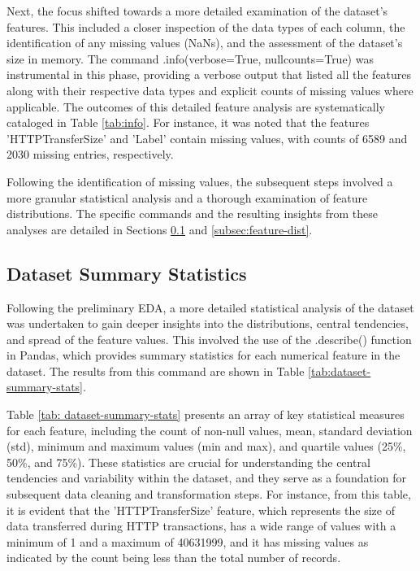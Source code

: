 Next, the focus shifted towards a more detailed examination of the dataset's features. This included a closer inspection of the data types of each column, the identification of any missing values (NaNs), and the assessment of the dataset's size in memory. The command .info(verbose=True, null\textunderscore counts=True) was instrumental in this phase, providing a verbose output that listed all the features along with their respective data types and explicit counts of missing values where applicable. The outcomes of this detailed feature analysis are systematically cataloged in Table \ref{tab:info}. For instance, it was noted that the features 'HTTPTransferSize' and 'Label' contain missing values, with counts of 6589 and 2030 missing entries, respectively.

Following the identification of missing values, the subsequent steps involved a more granular statistical analysis and a thorough examination of feature distributions. The specific commands and the resulting insights from these analyses are detailed in Sections \ref{subsec:ds-summary-statistics} and \ref{subsec:feature-dist}.


\subsection{Dataset Summary Statistics}\label{subsec:ds-summary-statistics} 
Following the preliminary EDA, a more detailed statistical analysis of the dataset was undertaken to gain deeper insights into the distributions, central tendencies, and spread of the feature values. This involved the use of the .describe() function in Pandas, which provides summary statistics for each numerical feature in the dataset. The results from this command are shown in Table \ref{tab:dataset-summary-stats}.

Table \ref{tab: dataset-summary-stats} presents an array of key statistical measures for each feature, including the count of non-null values, mean, standard deviation (std), minimum and maximum values (min and max), and quartile values (25\%, 50\%, and 75\%). These statistics are crucial for understanding the central tendencies and variability within the dataset, and they serve as a foundation for subsequent data cleaning and transformation steps. For instance, from this table, it is evident that the 'HTTPTransferSize' feature, which represents the size of data transferred during HTTP transactions, has a wide range of values with a minimum of 1 and a maximum of 40631999, and it has missing values as indicated by the count being less than the total number of records.


